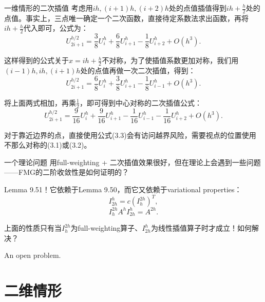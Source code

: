 \documentclass[9pt]{beamer}
\begin{document}
\begin{frame}{一维情形的二次插值}
考虑用$ih,(i+1)h,(i+2)h$处的点值插值得到$ih+\frac{h}{2}$处的点值。事实上，三点唯一确定一个二次函数，直接待定系数法求出函数，再将$ih+\frac{h}{2}$代入即可，公式为：
\begin{equation}
  U^{h/2}_{2i+1} = \frac{3}{8}U^h_{i} + \frac{6}{8}U^h_{i+1} - \frac{1}{8}U^h_{i+2} + O(h^3).
\end{equation}

\pause
这样得到的公式关于$x=ih+\frac{h}{2}$不对称，为了使插值系数更加对称，我们用$(i-1)h,ih,(i+1)h$处的点值再做一次二次插值，得到：
\begin{equation}
  U^{h/2}_{2i+1} = \frac{6}{8}U^h_{i} + \frac{3}{8}U^h_{i+1} - \frac{1}{8}U^h_{i-1} + O(h^3).
\end{equation}

\pause
将上面两式相加，再乘$\frac{1}{2}$，即可得到中心对称的二次插值公式：
\begin{equation}
  U^{h/2}_{2i+1} = \frac{9}{16}U^h_{i} + \frac{9}{16}U^h_{i+1} - \frac{1}{16}U^h_{i-1} - \frac{1}{16}U^h_{i+2} + O(h^3).
\end{equation}

\pause
对于靠近边界的点，直接使用公式(3.3)会有访问越界风险，需要视点的位置使用不那么对称的(3.1)或(3.2)。
\end{frame}

\begin{frame}{一个理论问题}
用full-weighting + 二次插值效果很好，但在理论上会遇到一些问题——FMG的二阶收敛性是如何证明的？
\vspace{1em}

\pause
Lemma 9.51！它依赖于Lemma 9.50，而它又依赖于variational properties：
\begin{equation}
I_{2h}^h=c(I_h^{2h})^T,
\end{equation}
\begin{equation}
I_h^{2h}A^hI_{2h}^h=A^{2h}.
\end{equation}

上面的性质只有当$I_h^{2h}$为full-weighting算子、$I_{2h}^h$为线性插值算子时才成立！如何解决？
\vspace{1em}

\pause
An open problem.
\end{frame}

\section{二维情形}
\end{document}
